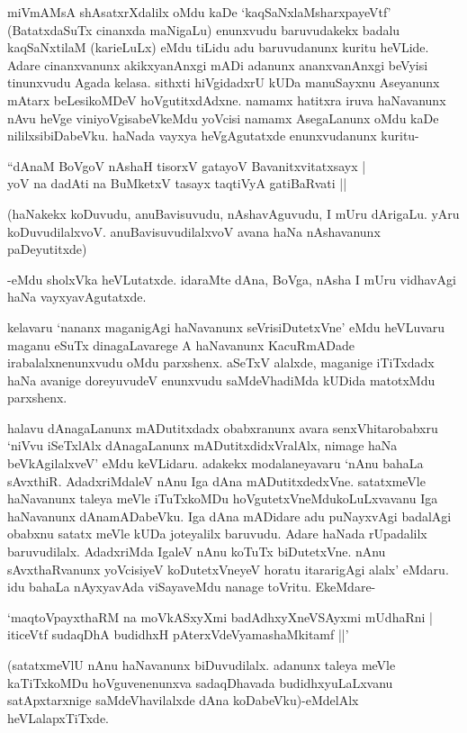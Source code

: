 miVmAMsA shAsatxrXdalilx oMdu kaDe `kaqSaNxlaMsharxpayeVtf' (BatatxdaSuTx cinanxda maNigaLu) enunxvudu baruvudakekx badalu kaqSaNxtilaM (karieLuLx) eMdu tiLidu adu baruvudanunx kuritu heVLide. Adare cinanxvanunx akikxyanAnxgi mADi adanunx ananxvanAnxgi beVyisi tinunxvudu Agada kelasa. sithxti hiVgidadxrU kUDa manuSayxnu Aseyanunx mAtarx beLesikoMDeV hoVgutitxdAdxne. namamx hatitxra iruva haNavanunx nAvu heVge viniyoVgisabeVkeMdu yoVcisi namamx AsegaLanunx oMdu kaDe nililxsibiDabeVku. haNada vayxya heVgAgutatxde enunxvudanunx kuritu-

\begin{shloka}
``dAnaM BoVgoV nAshaH tisorxV gatayoV Bavanitxvitatxsayx |\\
yoV na dadAti na BuMketxV tasayx taqtiVyA gatiBaRvati ||
\end{shloka}

(haNakekx koDuvudu, anuBavisuvudu, nAshavAguvudu, I mUru dArigaLu. yAru koDuvudilalxvoV. anuBavisuvudilalxvoV avana haNa nAshavanunx paDeyutitxde)

-eMdu sholxVka heVLutatxde. idaraMte dAna, BoVga, nAsha I mUru vidhavAgi haNa vayxyavAgutatxde.

kelavaru `nananx maganigAgi haNavanunx seVrisiDutetxVne' eMdu heVLuvaru maganu eSuTx dinagaLavarege A haNavanunx KacuRmADade irabalalxnenunxvudu oMdu parxshenx. aSeTxV alalxde, maganige iTiTxdadx haNa avanige doreyuvudeV enunxvudu saMdeVhadiMda kUDida matotxMdu parxshenx.

halavu dAnagaLanunx mADutitxdadx obabxranunx avara senxVhitarobabxru `niVvu iSeTxlAlx dAnagaLanunx mADutitxdidxVralAlx, nimage haNa beVkAgilalxveV' eMdu keVLidaru. adakekx modalaneyavaru `nAnu bahaLa sAvxthiR. AdadxriMdaleV nAnu Iga dAna mADutitxdedxVne. satatxmeVle haNavanunx taleya meVle iTuTxkoMDu hoVgutetxVneMdukoLuLxvavanu Iga haNavanunx dAnamADabeVku. Iga dAna mADidare adu puNayxvAgi badalAgi obabxnu satatx meVle kUDa joteyalilx baruvudu. Adare haNada rUpadalilx baruvudilalx. AdadxriMda IgaleV nAnu koTuTx biDutetxVne. nAnu sAvxthaRvanunx yoVcisiyeV koDutetxVneyeV horatu itararigAgi alalx' eMdaru. idu bahaLa nAyxyavAda viSayaveMdu nanage toVritu. EkeMdare-

\begin{shloka}
`maqtoVpayxthaRM na moVkASxyXmi badAdhxyXneVSAyxmi mUdhaRni |\\
iticeVtf sudaqDhA budidhxH pAterxVdeVyamashaMkitamf ||'
\end{shloka}

(satatxmeVlU nAnu haNavanunx biDuvudilalx. adanunx taleya meVle kaTiTxkoMDu hoVguvenenunxva sadaqDhavada budidhxyuLaLxvanu satApxtarxnige saMdeVhavilalxde dAna koDabeVku)-eMdelAlx heVLalapxTiTxde.

